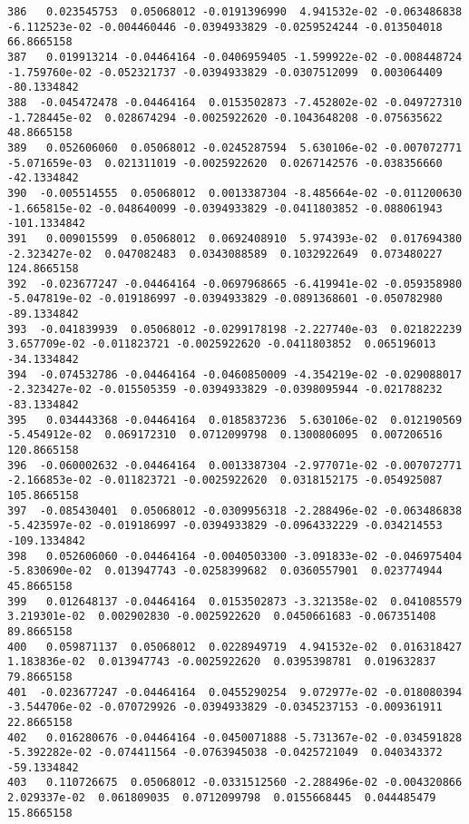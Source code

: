 \documentclass[15pt,a4paper,openright]{article}
\begin{document}
\begin{lstlisting}[language=AMPL, caption = data file]
386   0.023545753  0.05068012 -0.0191396990  4.941532e-02 -0.063486838 -6.112523e-02 -0.004460446 -0.0394933829 -0.0259524244 -0.013504018   66.8665158
387   0.019913214 -0.04464164 -0.0406959405 -1.599922e-02 -0.008448724 -1.759760e-02 -0.052321737 -0.0394933829 -0.0307512099  0.003064409  -80.1334842
388  -0.045472478 -0.04464164  0.0153502873 -7.452802e-02 -0.049727310 -1.728445e-02  0.028674294 -0.0025922620 -0.1043648208 -0.075635622   48.8665158
389   0.052606060  0.05068012 -0.0245287594  5.630106e-02 -0.007072771 -5.071659e-03  0.021311019 -0.0025922620  0.0267142576 -0.038356660  -42.1334842
390  -0.005514555  0.05068012  0.0013387304 -8.485664e-02 -0.011200630 -1.665815e-02 -0.048640099 -0.0394933829 -0.0411803852 -0.088061943 -101.1334842
391   0.009015599  0.05068012  0.0692408910  5.974393e-02  0.017694380 -2.323427e-02  0.047082483  0.0343088589  0.1032922649  0.073480227  124.8665158
392  -0.023677247 -0.04464164 -0.0697968665 -6.419941e-02 -0.059358980 -5.047819e-02 -0.019186997 -0.0394933829 -0.0891368601 -0.050782980  -89.1334842
393  -0.041839939  0.05068012 -0.0299178198 -2.227740e-03  0.021822239  3.657709e-02 -0.011823721 -0.0025922620 -0.0411803852  0.065196013  -34.1334842
394  -0.074532786 -0.04464164 -0.0460850009 -4.354219e-02 -0.029088017 -2.323427e-02 -0.015505359 -0.0394933829 -0.0398095944 -0.021788232  -83.1334842
395   0.034443368 -0.04464164  0.0185837236  5.630106e-02  0.012190569 -5.454912e-02  0.069172310  0.0712099798  0.1300806095  0.007206516  120.8665158
396  -0.060002632 -0.04464164  0.0013387304 -2.977071e-02 -0.007072771 -2.166853e-02 -0.011823721 -0.0025922620  0.0318152175 -0.054925087  105.8665158
397  -0.085430401  0.05068012 -0.0309956318 -2.288496e-02 -0.063486838 -5.423597e-02 -0.019186997 -0.0394933829 -0.0964332229 -0.034214553 -109.1334842
398   0.052606060 -0.04464164 -0.0040503300 -3.091833e-02 -0.046975404 -5.830690e-02  0.013947743 -0.0258399682  0.0360557901  0.023774944   45.8665158
399   0.012648137 -0.04464164  0.0153502873 -3.321358e-02  0.041085579  3.219301e-02  0.002902830 -0.0025922620  0.0450661683 -0.067351408   89.8665158
400   0.059871137  0.05068012  0.0228949719  4.941532e-02  0.016318427  1.183836e-02  0.013947743 -0.0025922620  0.0395398781  0.019632837   79.8665158
401  -0.023677247 -0.04464164  0.0455290254  9.072977e-02 -0.018080394 -3.544706e-02 -0.070729926 -0.0394933829 -0.0345237153 -0.009361911   22.8665158
402   0.016280676 -0.04464164 -0.0450071888 -5.731367e-02 -0.034591828 -5.392282e-02 -0.074411564 -0.0763945038 -0.0425721049  0.040343372  -59.1334842
403   0.110726675  0.05068012 -0.0331512560 -2.288496e-02 -0.004320866  2.029337e-02  0.061809035  0.0712099798  0.0155668445  0.044485479   15.8665158

\end{lstlisting}
\end{document}
